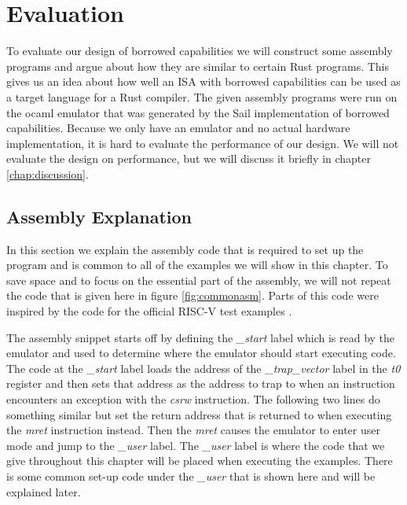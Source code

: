 \chapter{Evaluation}
\label{chap:evaluation}
To evaluate our design of borrowed capabilities we will construct some assembly programs and argue about how they are similar to certain Rust programs.
This gives us an idea about how well an ISA with borrowed capabilities can be used as a target language for a Rust compiler.
The given assembly programs were run on the ocaml emulator that was generated by the Sail implementation of borrowed capabilities.
Because we only have an emulator and no actual hardware implementation, it is hard to evaluate the performance of our design.
We will not evaluate the design on performance, but we will discuss it briefly in chapter \ref{chap:discussion}.


\section{Assembly Explanation}
In this section we explain the assembly code that is required to set up the program and is common to all of the examples we will show in this chapter.
To save space and to focus on the essential part of the assembly, we will not repeat the code that is given here in figure \ref{fig:commonasm}.
Parts of this code were inspired by the code for the official RISC-V test examples \cite{riscvtest}.

The assembly snippet starts off by defining the \textit{\_start} label which is read by the emulator and used to determine where the emulator should start executing code.
The code at the \textit{\_start} label loads the address of the \textit{\_trap\_vector} label in the \textit{t0} register and then sets that address as the address to trap to when an instruction encounters an exception with the \textit{csrw} instruction.
The following two lines do something similar but set the return address that is returned to when executing the \textit{mret} instruction instead.
Then the \textit{mret} causes the emulator to enter user mode and jump to the \textit{\_user} label.
The \textit{\_user} label is where the code that we give throughout this chapter will be placed when executing the examples.
There is some common set-up code under the \textit{\_user} that is shown here and will be explained later.

